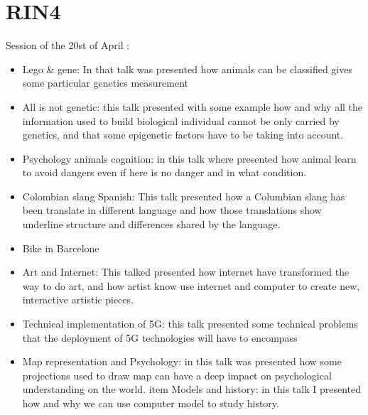 \documentclass[10pt,letterpaper]{article}
\begin{document}
%
%
%
%
%
%
%
%
%
%
\section{RIN4}
Session of the 20st of April :

\begin{itemize}
    \item Lego \& gene: In that talk was presented how animals can be classified gives some particular genetics measurement 
    \item All is not genetic: this talk presented with some example how and why all the information used to build biological individual cannot be only carried by genetics, and that some epigenetic factors have to be taking into account.
    \item Psychology animals cognition: in this talk where presented how animal learn to avoid dangers even if here is no danger and in what condition.
    \item Colombian slang Spanish: This talk presented how a Columbian slang has been translate in different language and how those translations show underline structure and differences shared by the language. 
    \item Bike in Barcelone
    \item Art and Internet: This talked presented how internet have transformed the way to do art, and how artist know use internet and computer to create new, interactive artistic pieces.
    \item Technical implementation of 5G: this talk presented some technical problems that the deployment of 5G technologies will have to encompass
    \item Map representation and Psychology: in this talk was presented how some projections used to draw map can have a deep impact on psychological understanding on the world.
    item Models and history: in this talk I presented how and why we can use computer model to study history.
\end{itemize}
\end{document}
